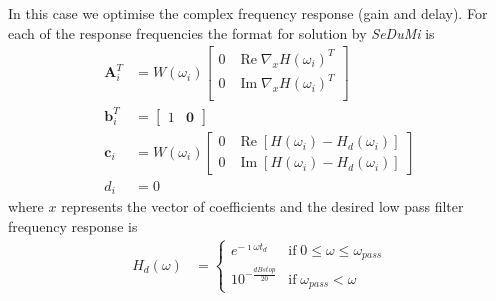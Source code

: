 \documentclass[a4paper,twoside,10pt,english]{report}
\begin{document}
In this case we optimise the complex frequency response (gain and delay).
For each of the response frequencies the format for solution by \emph{SeDuMi} is
\begin{align*}
\boldsymbol{A}_{i}^{T} &= W\left(\omega_{i}\right)\left[\begin{array}{cc}
0 & \operatorname{Re}\nabla_{x}H\left(\omega_{i}\right)^{T} \\
0 & \operatorname{Im}\nabla_{x}H\left(\omega_{i}\right)^{T} \\
\end{array}\right] \\
\boldsymbol{b}_{i}^{T} &= \left[\begin{array}{cc} 
1 & \boldsymbol{0} \end{array}\right] \\
\boldsymbol{c}_{i} &= W\left(\omega_{i}\right)\left[
\begin{array}{cc}
0 & \operatorname{Re}\left[H\left(\omega_{i}\right)-
H_{d}\left(\omega_{i}\right)\right] \\
0 & \operatorname{Im}\left[H\left(\omega_{i}\right)-
H_{d}\left(\omega_{i}\right)\right]
\end{array}\right] \\
d_{i} &= 0
\end{align*}
where $x$ represents the vector of coefficients and the desired low pass
filter frequency response is
\begin{align*}
H_{d}\left(\omega\right)&=\begin{cases}
e^{-\imath\omega t_{d}}&\text{if}\; 0\le\omega\le\omega_{pass}\\
10^{-\frac{dBstop}{20}}&\text{if}\;\omega_{pass}<\omega
\end{cases}
\end{align*}
\end{document}
